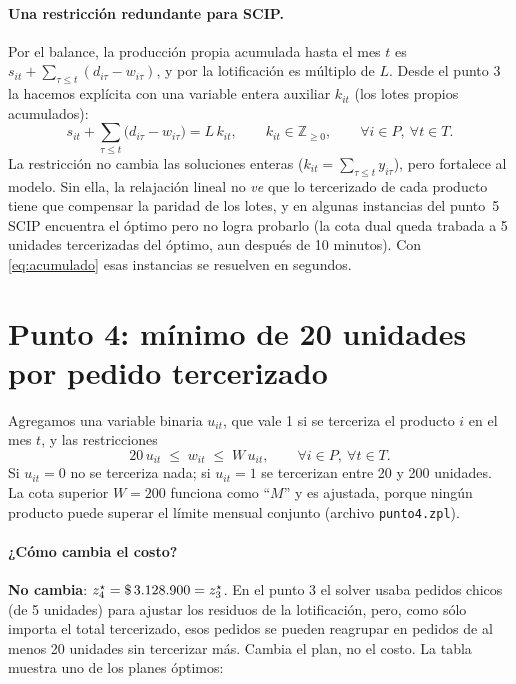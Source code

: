 \documentclass[11pt,a4paper]{article}
\begin{document}
\paragraph{Una restricción redundante para SCIP.} Por el balance, la
producción propia acumulada hasta el mes $t$ es
$s_{it} + \sum_{\tau \le t} (d_{i\tau} - w_{i\tau})$, y por la lotificación es
múltiplo de $L$. Desde el punto 3 la hacemos explícita con una variable entera
auxiliar $k_{it}$ (los lotes propios acumulados):
\begin{equation}
  s_{it} + \sum_{\tau \le t} \bigl(d_{i\tau} - w_{i\tau}\bigr) = L\,k_{it},
  \qquad k_{it} \in \mathbb{Z}_{\ge 0},
  \qquad \forall i \in P,\ \forall t \in T .
  \label{eq:acumulado}
\end{equation}
La restricción no cambia las soluciones enteras ($k_{it} = \sum_{\tau\le t}
y_{i\tau}$), pero fortalece al modelo. Sin ella, la relajación lineal no
\emph{ve} que lo tercerizado de cada producto tiene que compensar la paridad de
los lotes, y en algunas instancias del punto~5 SCIP encuentra el óptimo pero no
logra probarlo (la cota dual queda trabada a 5 unidades tercerizadas del
óptimo, aun después de 10 minutos). Con \eqref{eq:acumulado} esas instancias se
resuelven en segundos.

\section*{Punto 4: mínimo de 20 unidades por pedido tercerizado}

Agregamos una variable binaria $u_{it}$, que vale 1 si se terceriza el producto
$i$ en el mes $t$, y las restricciones
\begin{equation}
  20\,u_{it} \;\le\; w_{it} \;\le\; W\,u_{it}, \qquad \forall i \in P,\
  \forall t \in T .
  \label{eq:min20}
\end{equation}
Si $u_{it}=0$ no se terceriza nada; si $u_{it}=1$ se tercerizan entre 20 y 200
unidades. La cota superior $W=200$ funciona como ``$M$'' y es ajustada, porque
ningún producto puede superar el límite mensual conjunto (archivo
\texttt{punto4.zpl}).

\paragraph{¿Cómo cambia el costo?} \textbf{No cambia}: $z^{\star}_4 =
\$\,3.128.900 = z^{\star}_3$. En el punto 3 el solver usaba pedidos chicos (de 5
unidades) para ajustar los residuos de la lotificación, pero, como sólo importa
el total tercerizado, esos pedidos se pueden reagrupar en pedidos de al menos 20
unidades sin tercerizar más. Cambia el plan, no el costo. La tabla muestra uno
de los planes óptimos:
\end{document}
